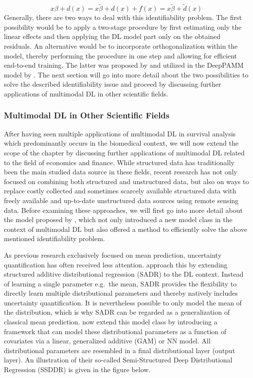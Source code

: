 \documentclass[
]{krantz}
\begin{document}
\[
x\beta + d(x) = x\widetilde{\beta} + d(x) + f(x) = x\widetilde{\beta} + \widetilde{d}(x)
\]
Generally, there are two ways to deal with this identifiability problem. The first possibility would be to apply a two-stage procedure by first estimating only the linear effects and then applying the DL model part only on the obtained residuals. An alternative would be to incorporate orthogonalization within the model, thereby performing the procedure in one step and allowing for efficient end-to-end training. The latter was proposed by \citet{SSDDR2020} and utilized in the DeepPAMM model by \citet{DeepPAMM2022}. The next section will go into more detail about the two possibilities to solve the described identifiability issue and proceed by discussing further applications of multimodal DL in other scientific fields.

\hypertarget{multimodal-dl-in-other-scientific-fields}{%
\subsubsection{Multimodal DL in Other Scientific Fields}\label{multimodal-dl-in-other-scientific-fields}}

After having seen multiple applications of multimodal DL in survival analysis which predominantly occurs in the biomedical context, we will now extend the scope of the chapter by discussing further applications of multimodal DL related to the field of economics and finance. While structured data has traditionally been the main studied data source in these fields, recent research has not only focused on combining both structured and unstructured data, but also on ways to replace costly collected and sometimes scarcely available structured data with freely available and up-to-date unstructured data sources using remote sensing data. Before examining these approaches, we will first go into more detail about the model proposed by \citet{SSDDR2020}, which not only introduced a new model class in the context of multimodal DL but also offered a method to efficiently solve the above mentioned identifiability problem.

As previous research exclusively focused on mean prediction, uncertainty quantification has often received less attention. \citet{SSDDR2020} approach this by extending structured additive distributional regression (SADR) to the DL context. Instead of learning a single parameter e.g.~the mean, SADR provides the flexibility to directly learn multiple distributional parameters and thereby natively includes uncertainty quantification. It is nevertheless possible to only model the mean of the distribution, which is why SADR can be regarded as a generalization of classical mean prediction. \citet{SSDDR2020} now extend this model class by introducing a framework that can model these distributional parameters as a function of covariates via a linear, generalized additive (GAM) or NN model. All distributional parameters are resembled in a final distributional layer (output layer). An illustration of their so-called Semi-Structured Deep Distributional Regression (SSDDR) is given in the figure below.
\end{document}
